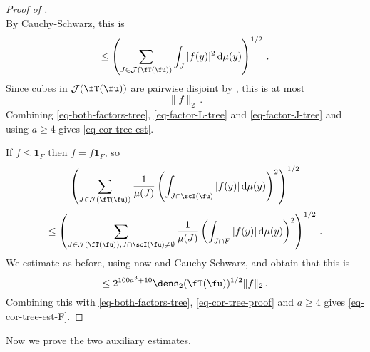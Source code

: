 \begin{proof}[Proof of ]
\begin{equation}
    \end{equation}
    By Cauchy-Schwarz, this is
    $$
        \le \left( \sum_{J \in \mathcal{J}(\fT(\fu))} \int_J |f(y)|^2 \, \mathrm{d}\mu(y) \right)^{1/2}\,.
    $$
    Since cubes in $\mathcal{J}(\fT(\fu))$ are pairwise disjoint by , this is at most
    \begin{equation}
        \label{eq-factor-J-tree}
        \|f\|_2\,.
    \end{equation}
    Combining \eqref{eq-both-factors-tree}, \eqref{eq-factor-L-tree} and \eqref{eq-factor-J-tree} and using $a \ge 4$ gives \eqref{eq-cor-tree-est}.

    If $f \le \mathbf{1}_F$ then $f = f\mathbf{1}_F$, so
    $$
        \left( \sum_{J \in \mathcal{J}(\fT(\fu))} \frac{1}{\mu(J)} \left(\int_{J \cap \scI(\fu)} |f(y)| \, \mathrm{d}\mu(y)\right)^2 \right)^{1/2}
    $$
    $$
        \le \left( \sum_{J \in \mathcal{J}(\fT(\fu)), J \cap \scI(\fu) \ne \emptyset} \frac{1}{\mu(J)} \left(\int_{J \cap F} |f(y)| \, \mathrm{d}\mu(y)\right)^2 \right)^{1/2}\,.
    $$
    We estimate as before, using now  and Cauchy-Schwarz, and obtain that this is
    $$
        \le 2^{100a^3 + 10} \dens_2(\fT(\fu))^{1/2} \|f\|_2\,.
    $$
    Combining this with \eqref{eq-both-factors-tree}, \eqref{eq-cor-tree-proof} and $a \ge 4$ gives \eqref{eq-cor-tree-est-F}.
\end{proof}

Now we prove the two auxiliary estimates.

